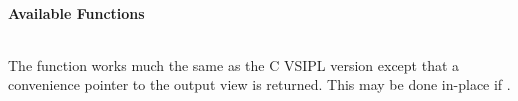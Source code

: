 \cvsiplh
\newline \hspace*{.8cm} \vspace*{.1cm} \textbf{Available Functions }
\newline \hspace*{1.1cm} {
\ttfamily
\begin{tabular}[H]{l}

\end{tabular}
}
\pyjvsiph
{}
\newline\hspace*{1.2cm}\parbox{10.8cm}{\vspace*{.1cm}The  function works much the same as the C VSIPL version except that a convenience pointer to the output view is returned. This may be done in-place if .}